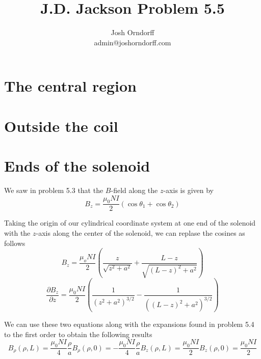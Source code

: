 \documentclass[10pt,a4paper]{article}
\begin{document}
\title{J.D. Jackson Problem 5.5}
\author{Josh Orndorff \\ admin@joshorndorff.com}
\maketitle

\section{The central region}
\section{Outside the coil}
\section{Ends of the solenoid}
We saw in problem 5.3 that the $B$-field along the $z$-axis is given by
\begin{equation}
B_z=\frac{\mu_0NI}{2}(\cos\theta_1+\cos\theta_2)
\end{equation}

Taking the origin of our cylindrical coordinate system at one end of the solenoid with the $z$-axis along the center of the solenoid, we can replase the cosines as follows
\begin{equation}
B_z=\frac{\mu_oNI}{2}\left(\frac{z}{\sqrt{z^2+a^2}}+\frac{L-z}{\sqrt{(L-z)^2+a^2}}\right)
\end{equation}
\begin{equation}
\frac{\partial B_z}{\partial z}=\frac{\mu_0NI}{2}\left(\frac{1}{(z^2+a^2)^{3/2}}-\frac{1}{((L-z)^2+a^2)^{3/2}}\right)
\end{equation}

We can use these two equations along with the expansions found in problem 5.4 to the first order to obtain the following results
\begin{subequations}
\begin{equation}
B_\rho(\rho,L)=\frac{\mu_0NI}{4}\frac{\rho}{a}
\end{equation}
\begin{equation}
B_\rho(\rho,0)=-\frac{\mu_0NI}{4}\frac{\rho}{a}
\end{equation}
\begin{equation}
B_z(\rho,L)=\frac{\mu_0NI}{2}
\end{equation}
\begin{equation}
B_z(\rho,0)=\frac{\mu_0NI}{2}
\end{equation}
\end{subequations}
\end{document}
